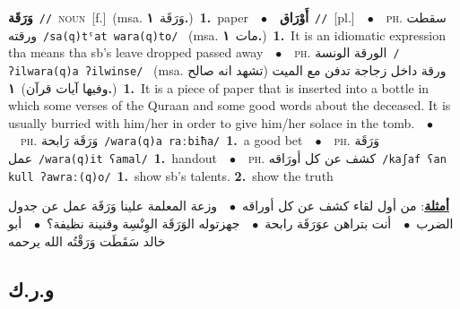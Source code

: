 \documentclass[10pt,a4paper,twoside]{article} %
\begin{document}
\begin{multicols}{2}
{\setlength\topsep{0pt}\textbf{\foreignlanguage{arabic}{وَرَقَة}}\ {\color{gray}\texttt{//}\color{black}}\ \textsc{noun}\ [f.]\ \color{gray}(msa. \foreignlanguage{arabic}{وَرَقَة}~\foreignlanguage{arabic}{\textbf{١.}})\color{black}\ \textbf{1.}~paper\ \ $\bullet$\ \ \setlength\topsep{0pt}\textbf{\foreignlanguage{arabic}{أَوْرَاق}}\ {\color{gray}\texttt{//}\color{black}}\ [pl.]\ \ $\bullet$\ \ \textsc{ph.} \color{gray} \foreignlanguage{arabic}{سقطت ورقته}\color{black}\ {\color{gray}\texttt{/{\sffamily sa(q)tˤat wara(q)to}/}\color{black}}\ \color{gray} (msa. \foreignlanguage{arabic}{مات}~\foreignlanguage{arabic}{\textbf{١.}})\color{black}\ \textbf{1.}~It is an idiomatic expression tha means tha sb's leave dropped passed away\ \ $\bullet$\ \ \textsc{ph.} \color{gray} \foreignlanguage{arabic}{الورقة الونسة}\color{black}\ {\color{gray}\texttt{/{\sffamily ʔilwara(q)a ʔilwinse}/}\color{black}}\ \color{gray} (msa. \foreignlanguage{arabic}{ورقة داخل زجاجة تدفن مع الميت (تشهد انه صالح وفيها آيات قرآن)}~\foreignlanguage{arabic}{\textbf{١.}})\color{black}\ \textbf{1.}~It is a piece of paper that is inserted into a bottle in which some verses of the Quraan and some good words about the deceased. It is usually burried with him/her in order to give him/her solace in the tomb.\ \ $\bullet$\ \ \textsc{ph.} \color{gray} \foreignlanguage{arabic}{وَرَقَة رَابحة}\color{black}\ {\color{gray}\texttt{/{\sffamily wara(q)a raːbiħa}/}\color{black}}\ \textbf{1.}~a good bet\ \ $\bullet$\ \ \textsc{ph.} \color{gray} \foreignlanguage{arabic}{وَرَقَة عمل}\color{black}\ {\color{gray}\texttt{/{\sffamily wara(q)it ʕamal}/}\color{black}}\ \textbf{1.}~handout\ \ $\bullet$\ \ \textsc{ph.} \color{gray} \foreignlanguage{arabic}{كشف عن كل أورَاقه}\color{black}\ {\color{gray}\texttt{/{\sffamily kaʃaf ʕan kull ʔawraː(q)o}/}\color{black}}\ \textbf{1.}~show sb's talents.  \textbf{2.}~show the truth\  \begin{flushright}\color{gray}\foreignlanguage{arabic}{\textbf{\underline{\foreignlanguage{arabic}{أمثلة}}}: من أول لقاء كشف عن كل أوراقه\ $\bullet$\ \  وزعة المعلمة علينا وَرَقَة عمل عن جدول الضرب\ $\bullet$\ \  أنت بتراهن عوَرَقَة رابحة\ $\bullet$\ \  جهزتوله الوَرَقَة الوِنْسِة وقنينة نظيفة؟\ $\bullet$\ \  أبو خالد سَقَطَت وَرَقْتُه الله يرحمه}\end{flushright}\color{black}} \vspace{2mm}

\vspace{-3mm}
\subsection*{\color{blue}\foreignlanguage{arabic}{و.ر.ك}\color{blue}{}} 


\end{multicols}
\end{document}

